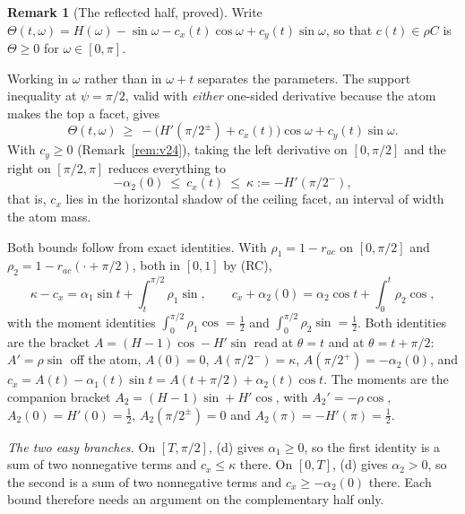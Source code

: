 \documentclass[11pt]{article}
\theoremstyle{definition}
\newtheorem{remark}[theorem]{Remark}
\begin{document}
\begin{remark}[The reflected half, proved]\label{rem:v29}
Write $\Theta(t,\omega)=H(\omega)-\sin\omega-c_x(t)\cos\omega+c_y(t)\sin\omega$, so that
$c(t)\in\rho C$ is $\Theta\ge0$ for $\omega\in[0,\pi]$.

Working in $\omega$ rather than in $\omega+t$ separates the parameters. The support inequality
at $\psi=\pi/2$, valid with \emph{either} one-sided derivative because the atom makes the top a
facet, gives
\[
  \Theta(t,\omega)\ \ge\ -\bigl(H'(\pi/2^\pm)+c_x(t)\bigr)\cos\omega+c_y(t)\sin\omega .
\]
With $c_y\ge0$ (Remark~\ref{rem:v24}), taking the left derivative on $[0,\pi/2]$ and the right
on $[\pi/2,\pi]$ reduces everything to
\[
  -\alpha_2(0)\ \le\ c_x(t)\ \le\ \kappa:=-H'(\pi/2^-) ,
\]
that is, $c_x$ lies in the horizontal shadow of the ceiling facet, an interval of width the
atom mass.

Both bounds follow from exact identities. With $\rho_1=1-r_{ac}$ on $[0,\pi/2]$ and
$\rho_2=1-r_{ac}(\cdot+\pi/2)$, both in $[0,1]$ by (RC),
\begin{equation}\label{eq:reflid}
  \kappa-c_x=\alpha_1\sin t+\int_t^{\pi/2}\!\rho_1\sin ,\qquad
  c_x+\alpha_2(0)=\alpha_2\cos t+\int_0^{t}\!\rho_2\cos ,
\end{equation}
with the moment identities $\int_0^{\pi/2}\rho_1\cos=\tfrac12$ and
$\int_0^{\pi/2}\rho_2\sin=\tfrac12$. Both identities are the bracket $A=(H-1)\cos-H'\sin$ read
at $\theta=t$ and at $\theta=t+\pi/2$: $A'=\rho\sin$ off the atom, $A(0)=0$,
$A(\pi/2^-)=\kappa$, $A(\pi/2^+)=-\alpha_2(0)$, and $c_x=A(t)-\alpha_1(t)\sin t
=A(t+\pi/2)+\alpha_2(t)\cos t$. The moments are the companion bracket
$A_2=(H-1)\sin+H'\cos$, with $A_2'=-\rho\cos$, $A_2(0)=H'(0)=\tfrac12$,
$A_2(\pi/2^\pm)=0$ and $A_2(\pi)=-H'(\pi)=\tfrac12$.

\emph{The two easy branches.} On $[T,\pi/2]$, (d) gives $\alpha_1\ge0$, so the first identity
is a sum of two nonnegative terms and $c_x\le\kappa$ there. On $[0,T]$, (d) gives
$\alpha_2>0$, so the second is a sum of two nonnegative terms and $c_x\ge-\alpha_2(0)$ there.
Each bound therefore needs an argument on the complementary half only.


\end{remark}
\end{document}
